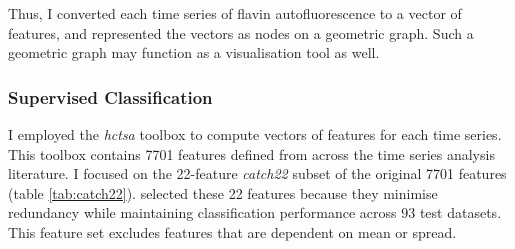 Thus, I converted each time series of flavin autofluorescence to a vector of features, and represented the vectors as nodes on a geometric graph.
Such a geometric graph may function as a visualisation tool as well.


\subsubsection{Supervised Classification}
\label{sec:graphclustering-supervised}

I employed the \emph{hctsa} toolbox \citep{fulcherHctsaComputationalFramework2017} to compute vectors of features for each time series.
This toolbox contains 7701 features defined from across the time series analysis literature.
I focused on the 22-feature \emph{catch22} subset of the original 7701 features (table \ref{tab:catch22}).
\citet{lubbaCatch22CAnonicalTimeseries2019} selected these 22 features because they minimise redundancy while maintaining classification performance across 93 test datasets.
This feature set excludes features that are dependent on mean or spread.

